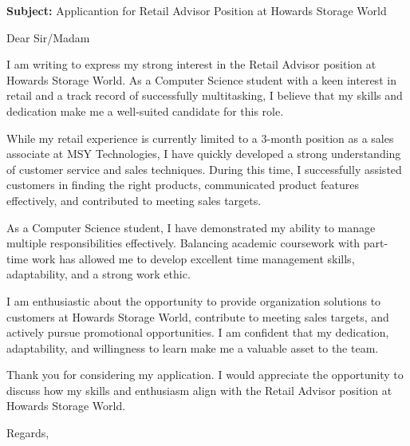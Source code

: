 \documentclass{letter}
\begin{document}
\begin{letter}{\textbf{Subject:} Applicantion for Retail Advisor Position at Howards Storage World }
\opening{Dear Sir/Madam}
I am writing to express my strong interest in the Retail Advisor position at Howards Storage World. As a Computer Science student with a keen interest in retail and a track record of successfully multitasking, I believe that my skills and dedication make me a well-suited candidate for this role.

While my retail experience is currently limited to a 3-month position as a sales associate at MSY Technologies, I have quickly developed a strong understanding of customer service and sales techniques. During this time, I successfully assisted customers in finding the right products, communicated product features effectively, and contributed to meeting sales targets.

As a Computer Science student, I have demonstrated my ability to manage multiple responsibilities effectively. Balancing academic coursework with part-time work has allowed me to develop excellent time management skills, adaptability, and a strong work ethic.

I am enthusiastic about the opportunity to provide organization solutions to customers at Howards Storage World, contribute to meeting sales targets, and actively pursue promotional opportunities. I am confident that my dedication, adaptability, and willingness to learn make me a valuable asset to the team.

Thank you for considering my application. I would appreciate the opportunity to discuss how my skills and enthusiasm align with the Retail Advisor position at Howards Storage World.
\closing{Regards,}
\end{letter}
\end{document}

